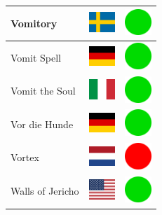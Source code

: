 \documentclass[12pt, a4paper, twoside]{report}
\begin{document}
\begin{center}
\begin{longtable}{|p{5cm}|p{2cm}|p{2cm}|}
Vomitory & \includegraphics[width=1cm]{4x3/se} & \includegraphics[width=1cm]{likes/y} \\ \hline
Vomit Spell & \includegraphics[width=1cm]{4x3/de} & \includegraphics[width=1cm]{likes/y} \\ \hline
Vomit the Soul & \includegraphics[width=1cm]{4x3/it} & \includegraphics[width=1cm]{likes/y} \\ \hline
Vor die Hunde & \includegraphics[width=1cm]{4x3/de} & \includegraphics[width=1cm]{likes/y} \\ \hline
Vortex & \includegraphics[width=1cm]{4x3/nl} & \includegraphics[width=1cm]{likes/n} \\ \hline
Walls of Jericho & \includegraphics[width=1cm]{4x3/us} & \includegraphics[width=1cm]{likes/y} \\ \hline

\end{longtable}
\end{center}
\end{document}
